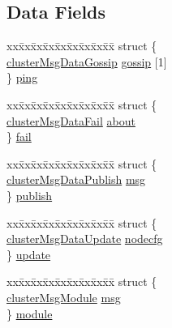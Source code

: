 \subsection*{Data Fields}
\begin{DoxyCompactItemize}
\item 
\begin{tabbing}
xx\=xx\=xx\=xx\=xx\=xx\=xx\=xx\=xx\=\kill
struct \{\\
\>\hyperlink{structcluster_msg_data_gossip}{clusterMsgDataGossip} \hyperlink{unioncluster_msg_data_a947036ec4730e07dd6bf6afcfd2943c4}{gossip} \mbox{[}1\mbox{]}\\
\} \hyperlink{unioncluster_msg_data_a9218ae70b8b801475bc8efe6247e3d7d}{ping}\\

\end{tabbing}\item 
\begin{tabbing}
xx\=xx\=xx\=xx\=xx\=xx\=xx\=xx\=xx\=\kill
struct \{\\
\>\hyperlink{structcluster_msg_data_fail}{clusterMsgDataFail} \hyperlink{unioncluster_msg_data_afcb3336ec3ec8c832bbd6616470f0536}{about}\\
\} \hyperlink{unioncluster_msg_data_ac6c2ee2b22c450e5ebc8461ff9b84dc1}{fail}\\

\end{tabbing}\item 
\begin{tabbing}
xx\=xx\=xx\=xx\=xx\=xx\=xx\=xx\=xx\=\kill
struct \{\\
\>\hyperlink{structcluster_msg_data_publish}{clusterMsgDataPublish} \hyperlink{unioncluster_msg_data_a4ff6a38329834bbe52476e58df71c3cd}{msg}\\
\} \hyperlink{unioncluster_msg_data_ac925b89ae9d9f7cc76c0c4d46eb35895}{publish}\\

\end{tabbing}\item 
\begin{tabbing}
xx\=xx\=xx\=xx\=xx\=xx\=xx\=xx\=xx\=\kill
struct \{\\
\>\hyperlink{structcluster_msg_data_update}{clusterMsgDataUpdate} \hyperlink{unioncluster_msg_data_a81e4031f10e290b02287e403ba31cfd9}{nodecfg}\\
\} \hyperlink{unioncluster_msg_data_a79d24828f041b8b0c2e982d3c019aaae}{update}\\

\end{tabbing}\item 
\begin{tabbing}
xx\=xx\=xx\=xx\=xx\=xx\=xx\=xx\=xx\=\kill
struct \{\\
\>\hyperlink{structcluster_msg_module}{clusterMsgModule} \hyperlink{unioncluster_msg_data_a6056b448b63ab91763d8efa704fc4079}{msg}\\
\} \hyperlink{unioncluster_msg_data_a2d0edf790842883d01f0f0857dd880c0}{module}\\

\end{tabbing}\end{DoxyCompactItemize}


